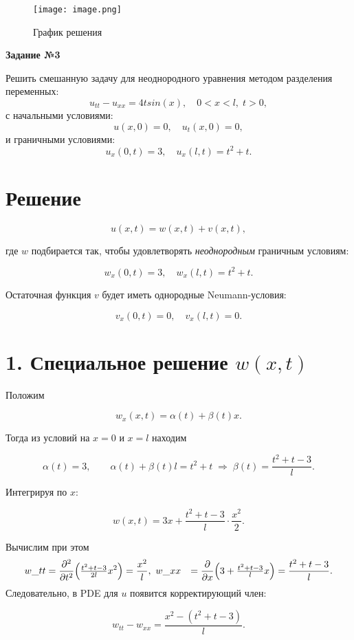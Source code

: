 \documentclass[a4paper,12pt]{article}
\begin{document}
\begin{figure}[htbp]
    \centering
    \texttt{[image: image.png]}
    \caption{График решения}
    \label{fig:enter-label}
\end{figure}
\vspace{130mm}
\begin{center}    
\noindent \textbf{Задание №3}
\end{center}
Решить смешанную задачу для неоднородного уравнения методом разделения переменных:
\[
u_{tt} - u_{xx} = 4 t sin(x), \quad 0 < x < l, \; t > 0,
\]
с начальными условиями:
\[
u(x, 0) = 0, \quad u_t(x, 0) = 0,
\]
и граничными условиями:
\[
u_x(0, t) = 3, \quad u_x(l, t) = t^2+t.
\]

\section*{Решение}
$$
  u(x,t)=w(x,t)+v(x,t),
$$

где $w$ подбирается так, чтобы удовлетворять \emph{неоднородным} граничным условиям:

$$
  w_x(0,t)=3,
  \quad w_x(l,t)=t^2+t.
$$

Остаточная функция $v$ будет иметь однородные Neumann-условия:

$$
  v_x(0,t)=0,
  \quad v_x(l,t)=0.
$$

\section*{1. Специальное решение $w(x,t)$} Положим

$$
  w_x(x,t)=\alpha(t)+\beta(t)x.
$$

Тогда из условий на $x=0$ и $x=l$ находим

$$
  \alpha(t)=3,\qquad
  \alpha(t)+\beta(t)l=t^2+t
  \;\Longrightarrow\;
  \beta(t)=\frac{t^2+t-3}{l}.
$$

Интегрируя по $x$:

$$
  w(x,t)=3x+\frac{t^2+t-3}{l}\cdot\frac{x^2}{2}.
$$

Вычислим при этом \begin{align*} w\_{tt}&=\frac{\partial^2}{\partial t^2}\Bigl(\tfrac{t^2+t-3}{2l}x^2\Bigr) =\frac{x^2}{l},\ w\_{xx}&=\frac{\partial}{\partial x}\Bigl(3+\tfrac{t^2+t-3}{l}x\Bigr) =\frac{t^2+t-3}{l}. \end{align*} Следовательно, в PDE для $u$ появится корректирующий член:

$$
  w_{tt}-w_{xx}=\frac{x^2-(t^2+t-3)}{l}.
$$
\end{document}
